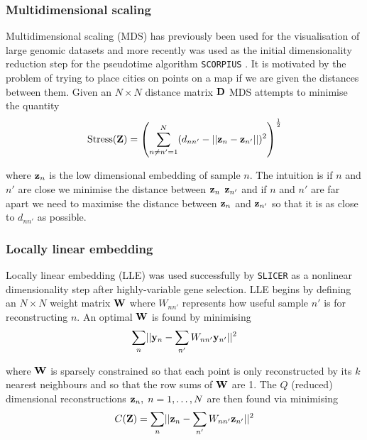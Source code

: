 \subsubsection{Multidimensional scaling}

Multidimensional scaling (MDS) has previously been used for the visualisation of large genomic datasets \cite{tzeng2008multidimensional} and more recently was used as the initial dimensionality reduction step for the pseudotime algorithm \texttt{SCORPIUS} \cite{cannoodt2016scorpius}. It is motivated by the problem of trying to place cities on points on a map if we are given the distances between them. Given an $N \times N$ distance matrix $\mathbf{D}$ MDS attempts to minimise the quantity
\begin{equation}
  \text{Stress}(\mathbf{Z}) = \left(
  \sum_{n \neq n' = 1}^N (d_{nn'} - \lvert \lvert \mathbf{z}_n - \mathbf{z}_{n'} \rvert \rvert)^2
  \right)^{\frac{1}{2}}
\end{equation}

where $\mathbf{z}_n$ is the low dimensional embedding of sample $n$. The intuition is if $n$ and $n'$ are close we minimise the distance between  $\mathbf{z}_n$  $\mathbf{z}_{n'}$ and if $n$ and $n'$ are far apart we need to maximise the distance between  $\mathbf{z}_n$  and $\mathbf{z}_{n'}$ so that it is as close to $d_{nn'}$ as possible.

\subsubsection{Locally linear embedding} \label{sec:lle}

Locally linear embedding (LLE) was used successfully by \texttt{SLICER} \cite{welch2016slicer} as a nonlinear dimensionality step after highly-variable gene selection. LLE begins by defining an $N \times N$ weight matrix $\mathbf{W}$ where $W_{nn'}$ represents how useful sample $n'$ is for reconstructing $n$. An optimal $\mathbf{W}$ is found by minimising
\begin{equation}
  \sum_{n} \lvert \lvert \mathbf{y}_n - \sum_{n'} W_{nn'} \mathbf{y}_{n'} \rvert \rvert^2
\end{equation}

where $\mathbf{W}$ is sparsely constrained so that each point is only reconstructed by its $k$ nearest neighbours and so that the row sums of $\mathbf{W}$ are 1. The $Q$ (reduced) dimensional reconstructions $\mathbf{z}_n, \; n = 1, \ldots, N$ are then found via minimising
\begin{equation}
  C(\mathbf{Z}) = \sum_{n} \lvert \lvert \mathbf{z}_n - \sum_{n'} W_{nn'} \mathbf{z}_{n'} \rvert \rvert^2
\end{equation}

